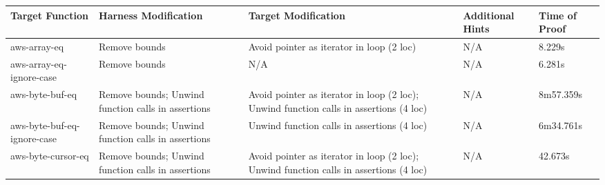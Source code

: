\begin{table}
	\begin{tabularx}{\textwidth}{XXXXX}
		\toprule
		Target Function                         & Harness Modification                                                      & Target Modification                                                                    & Additional Hints                                                      & Time of Proof \\
		\midrule
		aws-array-eq                            & Remove bounds                                                             & Avoid pointer as iterator in loop (2 loc)                                              & N/A                                                                   & 8.229s        \\
	
		aws-array-eq-ignore-case                & Remove bounds                                                             & N/A                                                                                    & N/A                                                                   & 6.281s        \\
		aws-byte-buf-eq                         & Remove bounds; Unwind function calls in assertions                        & Avoid pointer as iterator in loop (2 loc); Unwind function calls in assertions (4 loc) & N/A                                                                   & 8m57.359s     \\
		aws-byte-buf-eq-ignore-case             & Remove bounds; Unwind function calls in assertions                        & Unwind function calls in assertions (4 loc)                                            & N/A                                                                   & 6m34.761s     \\
	
		aws-byte-cursor-eq                      & Remove bounds; Unwind function calls in assertions                        & Avoid pointer as iterator in loop (2 loc); Unwind function calls in assertions (4 loc) & N/A                                                                   & 42.673s       \\
	

\end{tabularx}
\end{table}
